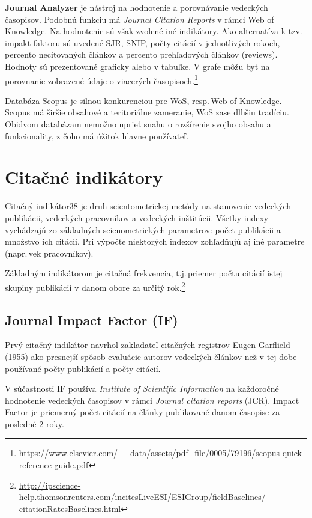 \textbf{Journal Analyzer} je nástroj na hodnotenie a porovnávanie vedeckých
časopisov.  Podobnú funkciu má \emph{Journal Citation Reports} v rámci Web of
Knowledge.  Na hodnotenie sú však zvolené iné indikátory.  Ako alternatíva k
tzv.\,impakt-faktoru sú uvedené SJR, SNIP, počty citácií v jednotlivých rokoch,
percento necitovaných článkov a percento prehľadových článkov (reviews).
Hodnoty sú prezentované graficky alebo v tabuľke.  V grafe môžu byť na
porovnanie zobrazené údaje o viacerých
časopisoch.\footnote{\url{https://www.elsevier.com/__data/assets/pdf_file/0005/79196/scopus-quick-reference-guide.pdf}}

Databáza Scopus je silnou konkurenciou pre WoS, resp.\,Web of Knowledge.  Scopus
má širšie obsahové a teritoriálne zameranie, WoS zase dlhšiu tradíciu.  Obidvom
databázam nemožno uprieť snahu o rozšírenie svojho obsahu a funkcionality, z
čoho má úžitok hlavne používateľ.


\section{Citačné indikátory}
\label{sec:citation.indicators}

Citačný indikátor38 je druh scientometrickej metódy na stanovenie 
vedeckých publikácii, vedeckých pracovníkov a vedeckých inštitúcii.  Všetky
indexy vychádzajú zo základných scienometrických parametrov: počet publikácii a
množstvo ich citácii.  Pri výpočte niektorých indexov zohľadňujú aj iné
parametre (napr.\,vek pracovníkov).

Základným indikátorom je citačná frekvencia, t.j.\,priemer počtu citácií istej
skupiny publikácií v danom obore za určitý
rok.\footnote{\url{http://ipscience-help.thomsonreuters.com/incitesLiveESI/ESIGroup/fieldBaselines/
    citationRatesBaselines.html}}


\subsection{Journal Impact Factor (IF)}

Prvý citačný indikátor navrhol zakladateľ citačných registrov Eugen Garflield
(1955) ako presnejší spôsob evaluácie autorov vedeckých článkov než v tej dobe
používané počty publikácií a počty citácií.

V súčastnosti IF používa \emph{Institute of Scientific Information} na
každoročné hodnotenie vedeckých časopisov v rámci \emph{Journal citation
  reports} (JCR).  Impact Factor je priemerný počet citácií na články
publikované danom časopise za posledné 2 roky.


